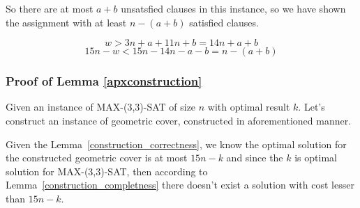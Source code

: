 So there are at most $a+b$ unsatsfied clauses in this instance,
so we have shown the assignment with at least  $n-(a+b)$ satisfied clauses.

$$w > 3n + a + 11n + b = 14n + a + b$$
$$15n - w  < 15n - 14 n - a - b = n - (a+b)$$

\subsubsection{Proof of Lemma \ref{apxconstruction}}
Given an instance of MAX-(3,3)-SAT of size $n$
with optimal result $k$.
Let's construct an instance of geometric cover,
constructed in aforementioned manner.

Given the Lemma~\ref{construction_correctness}, we know
the optimal solution for the constructed geometric cover is
at most $15n - k$ and since the $k$ is optimal solution
for MAX-(3,3)-SAT, then according to Lemma~\ref{construction_completness}
there doesn't exist a solution with cost lesser than $15n - k$.

